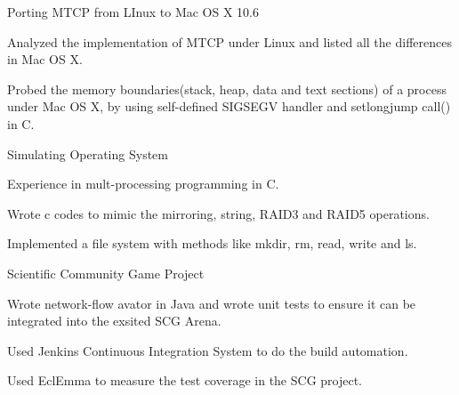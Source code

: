 \begin{cventries}
\cventry
{Porting MTCP from LInux to Mac OS X 10.6} %
{} %
{} %
{} %
{ %
\begin{cvitems}
\item {Analyzed the implementation of MTCP under Linux and listed all the differences in Mac OS X.}
\item {Probed the memory boundaries(stack, heap, data and text sections) of a process under Mac OS X, by using self-defined SIGSEGV handler and setlongjump call() in C.}
\end{cvitems}
}


\cventry
{Simulating Operating System} %
{} %
{} %
{} %
{ %
\begin{cvitems}
\item {Experience in mult-processing programming in C.}
\item {Wrote c codes to mimic the mirroring, string, RAID3 and RAID5 operations.}
\item {Implemented a file system with methods like mkdir, rm, read, write and ls.}
\end{cvitems}
}

\cventry
{Scientific Community Game Project} %
{} %
{} %
{} %
{ %
\begin{cvitems}
\item {Wrote network-flow avator in Java and wrote unit tests to ensure it can be integrated into the exsited SCG Arena.}
\item {Used Jenkins Continuous Integration System to do the build automation.}
\item {Used EclEmma to measure the test coverage in the SCG project.}
\end{cvitems}
}


\end{cventries}